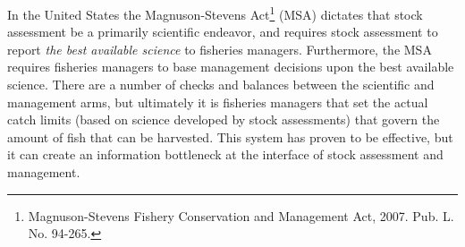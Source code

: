 \documentclass[12pt]{ucscthesis}
\begin{document}
In the United States the Magnuson-Stevens Act\footnote{Magnuson-Stevens Fishery Conservation and Management Act, 2007. Pub. L. No. 94-265.} (MSA)
dictates that stock assessment be a primarily scientific endeavor, and requires 
stock assessment to report \textit{the best available science} 
to fisheries managers. Furthermore, the MSA requires fisheries managers %
to base management decisions upon the best available science. 
There are a number of checks and balances between the scientific and management 
arms, but ultimately it is fisheries managers that set the actual catch limits 
(based on science developed by stock assessments) that govern the amount of fish 
that can be harvested. This system has proven to be effective, but it can %
create an information bottleneck at the interface of stock assessment and 
management. 





\end{document}
